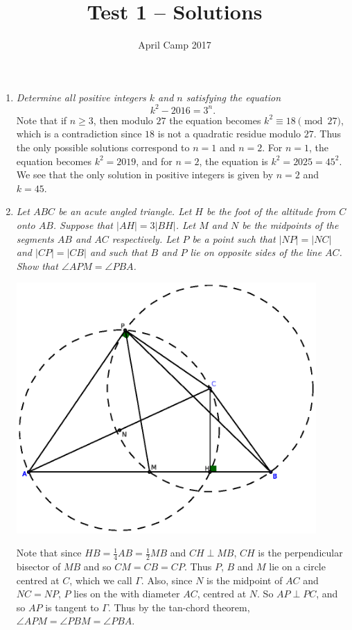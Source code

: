 \documentclass[a4paper,12pt]{article}
\author{April Camp 2017}
\title{Test 1 -- Solutions}
\date{}
\begin{document}
 \maketitle

\begin{enumerate}
	\item 
	\textit{Determine all positive integers $k$ and $n$ satisfying the equation \[k^2 - 2016 = 3^n.\]}
	Note that if $n \geq 3$, then modulo $27$ the equation becomes $k^2 \equiv
	18 \pmod{27}$, which is a contradiction since $18$ is not a quadratic residue
	modulo $27$. Thus the only possible solutions correspond to $n=1$ and
	$n=2$. For $n=1$, the equation becomes $k^2 = 2019$, and for $n=2$, the
	equation is $k^2 = 2025 = 45^2$. We see that the only solution in
	positive integers is given by $n=2$ and $k=45$.
		
	\item 
	\textit{Let $ABC$ be an acute angled triangle. Let $H$ be the foot of the altitude from $C$ onto $AB$. Suppose that $|AH|=3|BH|$. Let $M$ and $N$ be the midpoints of the segments $AB$ and $AC$ respectively. Let $P$ be a point such that $|NP|=|NC|$ and $|CP|=|CB|$ and such that $B$ and $P$ lie on opposite sides of the line $AC$. Show that $\angle APM = \angle PBA$.}
	
	{\centering \includegraphics[width=0.9\textwidth]{T1Q2.eps}}
	
	Note that since $HB =\frac{1}{4}AB =\frac{1}{2}MB$ and $CH \perp MB$, $CH$ is the perpendicular bisector of $MB$ and so $CM=CB=CP$. Thus $P$, $B$ and $M$ lie on a circle centred at $C$, which we call $\Gamma$. Also, since $N$ is the midpoint of $AC$ and $NC=NP$, $P$ lies on the with diameter $AC$, centred at $N$. So $AP \perp PC$, and so $AP$ is tangent to $\Gamma$. Thus by the tan-chord theorem, $\angle APM =\angle PBM =\angle PBA$.
	

\end{enumerate}
\end{document}
